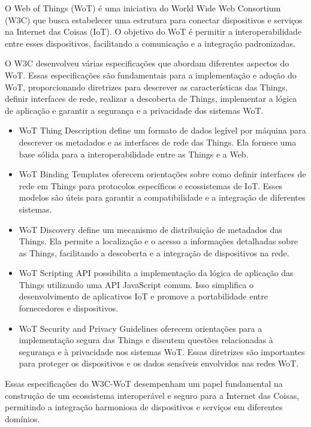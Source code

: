 O Web of Things (WoT) é uma iniciativa do World Wide Web Consortium (W3C) que busca estabelecer uma estrutura para conectar dispositivos e serviços na Internet das Coisas (IoT). O objetivo do WoT é permitir a interoperabilidade entre esses dispositivos, facilitando a comunicação e a integração padronizadas.

O W3C desenvolveu várias especificações que abordam diferentes aspectos do WoT. Essas especificações são fundamentais para a implementação e adoção do WoT, proporcionando diretrizes para descrever as características das Things, definir interfaces de rede, realizar a descoberta de Things, implementar a lógica de aplicação e garantir a segurança e a privacidade dos sistemas WoT.

\begin{itemize}
   \item WoT Thing Description  define um formato de dados legível por máquina para descrever os metadados e as interfaces de rede das Things. Ela fornece uma base sólida para a interoperabilidade entre as Things e a Web.
   \item WoT Binding Templates  oferecem orientações sobre como definir interfaces de rede em Things para protocolos específicos e ecossistemas de IoT. Esses modelos são úteis para garantir a compatibilidade e a integração de diferentes sistemas.
    \item WoT Discovery  define um mecanismo de distribuição de metadados das Things. Ela permite a localização e o acesso a informações detalhadas sobre as Things, facilitando a descoberta e a integração de dispositivos na rede.
    \item WoT Scripting API  possibilita a implementação da lógica de aplicação das Things utilizando uma API JavaScript comum. Isso simplifica o desenvolvimento de aplicativos IoT e promove a portabilidade entre fornecedores e dispositivos.
    \item WoT Security and Privacy Guidelines  oferecem orientações para a implementação segura das Things e discutem questões relacionadas à segurança e à privacidade nos sistemas WoT. Essas diretrizes são importantes para proteger os dispositivos e os dados sensíveis envolvidos nas redes WoT.
\end{itemize}

Essas especificações do W3C-WoT desempenham um papel fundamental na construção de um ecossistema interoperável e seguro para a Internet das Coisas, permitindo a integração harmoniosa de dispositivos e serviços em diferentes domínios.


